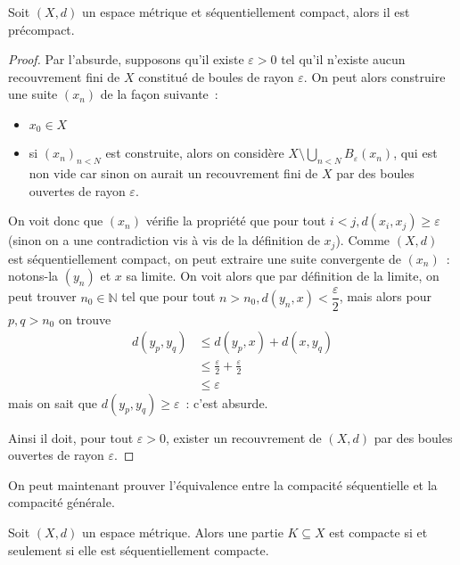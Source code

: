 \begin{lemma}\label{lem.precomp}
  Soit $(X,d)$ un espace métrique et séquentiellement compact, alors il est
  précompact.
\end{lemma}

\begin{proof}
  Par l'absurde, supposons qu'il existe $\varepsilon > 0$ tel qu'il n'existe
  aucun recouvrement fini de $X$ constitué de boules de rayon $\varepsilon$.
  On peut alors construire une suite $(x_n)$ de la façon suivante~:
  \begin{itemize}
  \item $x_0 \in X$
  \item si $(x_n)_{n < N}$ est construite, alors on considère
    $\displaystyle X\setminus \bigcup_{n < N} B_\varepsilon(x_n)$, qui est non
    vide car sinon on aurait un recouvrement fini de $X$ par des boules ouvertes
    de rayon $\varepsilon$.
  \end{itemize}
  On voit donc que $(x_n)$ vérifie la propriété que pour tout
  $i < j, d(x_i,x_j) \geq \varepsilon$ (sinon on a une contradiction vis à vis
  de la définition de $x_j$). Comme $(X,d)$ est séquentiellement compact, on
  peut extraire une suite convergente de $(x_n)$~: notons-la $(y_n)$ et $x$ sa
  limite. On voit alors que par définition de la limite, on peut trouver
  $n_0\in\mathbb N$ tel que pour tout
  $n > n_0, d(y_n,x) < \dfrac{\varepsilon}{2}$, mais alors pour $p,q > n_0$ on
  trouve
  \begin{align*}
    d(y_p,y_q) &\leq d(y_p,x) + d(x,y_q)\\
    &\leq \frac\varepsilon 2 + \frac\varepsilon 2\\
    &\leq \varepsilon
  \end{align*}
  mais on sait que $d(y_p,y_q) \geq \varepsilon$~: c'est absurde.

  Ainsi il doit, pour tout $\varepsilon > 0$, exister un recouvrement de $(X,d)$
  par des boules ouvertes de rayon $\varepsilon$.
\end{proof}

On peut maintenant prouver l'équivalence entre la compacité séquentielle et la
compacité générale.

\begin{theorem}
  Soit $(X,d)$ un espace métrique. Alors une partie $K\subseteq X$ est compacte
  si et seulement si elle est séquentiellement compacte.
\end{theorem}

